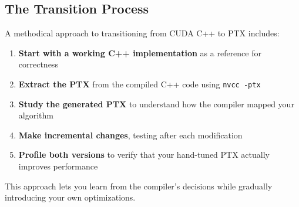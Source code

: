 \subsection{The Transition Process}

A methodical approach to transitioning from CUDA C++ to PTX includes:

\begin{enumerate}
    \item \textbf{Start with a working C++ implementation} as a reference for correctness
    
    \item \textbf{Extract the PTX} from the compiled C++ code using \texttt{nvcc -ptx}
    
    \item \textbf{Study the generated PTX} to understand how the compiler mapped your algorithm
    
    \item \textbf{Make incremental changes}, testing after each modification
    
    \item \textbf{Profile both versions} to verify that your hand-tuned PTX actually improves performance
\end{enumerate}

This approach lets you learn from the compiler's decisions while gradually introducing your own optimizations.

